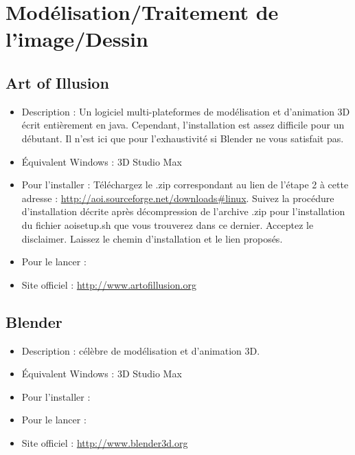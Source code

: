\section{Modélisation/Traitement de l'image/Dessin}
\subsection{Art of Illusion}
\begin{itemize}
\begingroup
{}
\item Description : Un logiciel multi-plateformes de modélisation et d'animation 3D écrit entièrement en java. Cependant, l'installation est assez difficile pour un débutant. Il n'est ici que pour l'exhaustivité si Blender ne vous satisfait pas.{\par}
\item Équivalent Windows : 3D Studio Max{\par}
\endgroup
\item Pour l'installer : Téléchargez le .zip correspondant au lien de l'étape 2 à cette adresse : \url{http://aoi.sourceforge.net/downloads#linux}. Suivez la procédure d'installation décrite après décompression de l'archive .zip pour l'installation du fichier aoisetup.sh que vous trouverez dans ce dernier. Acceptez le disclaimer. Laissez le chemin d'installation et le lien proposés.{\par}
\item Pour le lancer : 
\item Site officiel : \url{http://www.artofillusion.org}{\par}
\end{itemize}
\subsection{Blender}
\begin{itemize}
\begingroup
{}
\item Description :  célèbre de modélisation et d'animation 3D.{\par}
\item Équivalent Windows : 3D Studio Max{\par}
\item Pour l'installer : 
\item Pour le lancer : 
\item Site officiel : \url{http://www.blender3d.org}{\par}
\endgroup
\end{itemize}
\newpage
